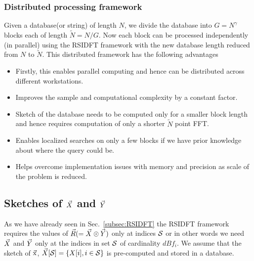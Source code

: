 \subsubsection{Distributed processing framework}
Given a database(or string) of length $N$, we divide the database into $G=N^\gamma$ blocks each of length $\tilde{N} = N/G$. Now each block can be processed independently (in parallel) using the RSIDFT framework with the new database length reduced from $N$ to $\tilde{N}$. This distributed framework has the following advantages
\begin{itemize}
	\item Firstly, this enables parallel computing and hence can be distributed across different workstations.
	\item Improves the sample and computational complexity by a constant factor.
	\item Sketch of the database needs to be computed only for a smaller block length and hence requires computation of only a shorter $\tilde{N}$ point FFT.
	\item Enables localized searches on only a few blocks if we have prior knowledge about where the query could be. %
	\item Helps overcome implementation issues with memory and precision as scale of the problem is reduced. 
\end{itemize}
\subsection{Sketches of $\vec{X}$ and $\vec{Y}$}
\label{subsec:skteches}		
 As we have already seen in Sec.~\ref{subsec:RSIDFT} the RSIDFT framework requires the values of $\vec{R}(=\vec{X}\odot \vec{Y})$ only at indices $\mathcal{S}$ or in other words we need $\vec{X}$ and $\vec{Y}$ only at the indices in set $\mathcal{S}$ of cardinality $dBf_i$. We assume that the sketch of $\vec{\mathrm{x}}$, $ \vec{X}[\mathcal{S}]= \{X[i],i\in \mathcal{S}\}$ is pre-computed and stored in a database.

